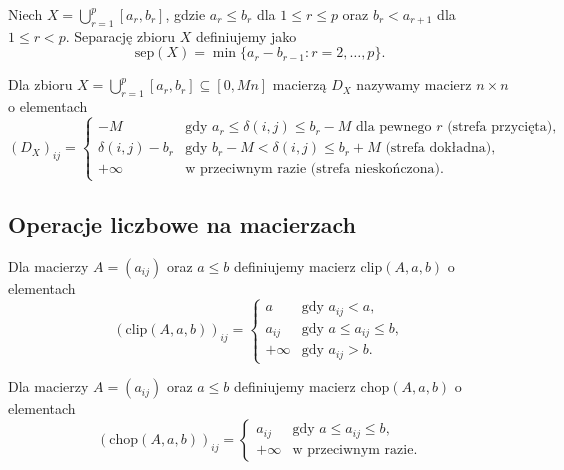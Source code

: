\begin{definicja}
Niech $X = \bigcup_{r=1}^{p} [a_r, b_r]$, gdzie $a_r \leq b_r$ dla $1 \leq r \leq p$ oraz $b_r < a_{r+1}$ dla $1 \leq r < p$. Separację zbioru $X$ definiujemy jako
\[
\mathrm{sep}(X) = \min\{a_r - b_{r-1} : r = 2, \ldots, p\}.
\]
\end{definicja}

\begin{definicja}
Dla zbioru $X = \bigcup_{r=1}^{p} [a_r, b_r] \subseteq [0, Mn]$ macierzą $D_X$ nazywamy macierz $n \times n$ o elementach
\[
(D_X)_{ij} = \begin{cases}
-M & \text{gdy } a_r \leq \delta(i,j) \leq b_r - M \text{ dla pewnego } r \text{ (strefa przycięta)},\\
\delta(i,j) - b_r & \text{gdy } b_r - M < \delta(i,j) \leq b_r + M \text{ (strefa dokładna)},\\
+\infty & \text{w przeciwnym razie (strefa nieskończona).}
\end{cases}
\]
\end{definicja}

\subsection{Operacje liczbowe na macierzach}

\begin{definicja}[Obcinanie]
Dla macierzy $A = (a_{ij})$ oraz $a \leq b$ definiujemy macierz $\mathrm{clip}(A, a, b)$ o elementach
\[
(\mathrm{clip}(A, a, b))_{ij} = \begin{cases}
a & \text{gdy } a_{ij} < a, \\
a_{ij} & \text{gdy } a \leq a_{ij} \leq b, \\
+\infty & \text{gdy } a_{ij} > b.
\end{cases}
\]
\end{definicja}

\begin{definicja}[Wycinanie]
Dla macierzy $A = (a_{ij})$ oraz $a \leq b$ definiujemy macierz $\mathrm{chop}(A, a, b)$ o elementach
\[
(\mathrm{chop}(A, a, b))_{ij} = \begin{cases}
a_{ij} & \text{gdy } a \leq a_{ij} \leq b, \\
+\infty & \text{w przeciwnym razie.}
\end{cases}
\]
\end{definicja}

